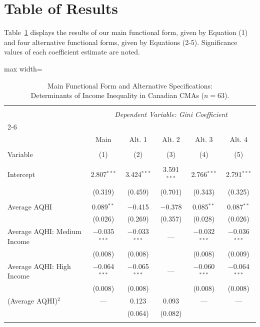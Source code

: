 \documentclass[AEJ]{AEA}
\begin{document}
\section{Table of Results}
Table~\ref{tab:reg_results} displays the results of our main functional form, given by Equation (1) and
four alternative functional forms, given by Equations (2-5). Significance values of each coefficient 
estimate are noted.
\begin{table}[!htbp] \centering 
  \caption{Main Functional Form and Alternative Specifications:\\Determinants of Income 
  Inequality in Canadian CMAs ($n = 63$).} 
  \label{tab:reg_results} 
\begin{adjustbox}{max width=\textwidth}
\begin{tabular}{@{\extracolsep{5pt}}lccccc} 
\\[-1.8ex]\hline 
\hline \\[-1.8ex] 
 & \multicolumn{5}{c}{\textit{Dependent Variable: Gini Coefficient}} \\ 
\cline{2-6} 
\\[-1.8ex] & Main & Alt. 1 & Alt. 2 & Alt. 3 & Alt. 4 \\ 
\\[-1.8ex] Variable & (1) & (2) & (3) & (4) & (5) \\ 
\hline \\[-1.8ex] 
Intercept & 2.807$^{***}$ & 3.424$^{***}$ & 3.591$^{***}$ & 2.766$^{***}$ & 2.791$^{***}$ \\
 & (0.319) & (0.459) & (0.701) & (0.343) & (0.325)  \\
\\
Average AQHI & 0.089$^{**}$ & $-$0.415 & $-$0.378 & 0.085$^{**}$ & 0.087$^{**}$ \\ 
 & (0.026) & (0.269) & (0.357) & (0.028) & (0.026)  \\ 
Average AQHI: Medium Income & $-$0.035$^{***}$ & $-$0.033$^{***}$ & --- & $-$0.032$^{***}$ 
& $-$0.036$^{***}$ \\ 
 & (0.008) & (0.008) &  & (0.008) & (0.009)  \\ 
Average AQHI: High Income & $-$0.064$^{***}$ & $-$0.065$^{***}$ & --- & $-$0.060$^{***}$ 
& $-$0.064$^{***}$ \\ 
 & (0.008) & (0.008) &  & (0.008) & (0.008) \\ 
(Average AQHI)$^2$ & --- & 0.123 & 0.093 & --- & ---  \\ 
 &  & (0.064) & (0.082) & & \\ 
\\

\end{tabular}
\end{adjustbox}
\end{table}
\end{document}
